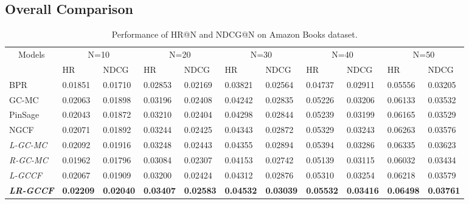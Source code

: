 \documentclass[letterpaper]{article} %
\begin{document}
\subsection{Overall Comparison}  

 

\begin{small} 
\begin{table}[h]
\footnotesize
\centering
\caption{Performance of HR@N and NDCG@N on Amazon Books dataset. }\label{tab:resAmazon} 
\begin{tabular}{|l|l|l|l|l|l|l|l|l|l|l|}
\hline
\multicolumn{1}{|c|}{\multirow{2}{*}{Models}} & \multicolumn{2}{c|}{N=10} & \multicolumn{2}{c|}{N=20} & \multicolumn{2}{c|}{N=30} & \multicolumn{2}{c|}{N=40} & \multicolumn{2}{c|}{N=50} \\ \cline{2-11} 
\multicolumn{1}{|c|}{} & HR & NDCG & HR & NDCG & HR & NDCG & HR & NDCG & HR & NDCG \\ \hline
BPR & 0.01851 & 0.01710 & 0.02853 & 0.02169 & 0.03821 & 0.02564 & 0.04737 & 0.02911 & 0.05556 & 0.03205 \\ \hline 
GC-MC & 0.02063 & 0.01898 & 0.03196 & 0.02408 & 0.04242 & 0.02835 & 0.05226 & 0.03206 & 0.06133 & 0.03532 \\ \hline
PinSage & 0.02043 & 0.01872 & 0.03210 & 0.02404 & 0.04298 & 0.02844 & 0.05239 & 0.03199 & 0.06165 & 0.03529 \\ \hline
NGCF & 0.02071 & 0.01892 & 0.03244 & 0.02425 & 0.04343 & 0.02872 & 0.05329 & 0.03243 & 0.06263 & 0.03576 \\ \hline
\emph{L-GC-MC} & 0.02092 & 0.01916 & 0.03248 & 0.02443 & 0.04355 & 0.02894 & 0.05394 & 0.03286 & 0.06335 & 0.03623 \\ \hline
\emph{R-GC-MC} & 0.01962 & 0.01796 & 0.03084 & 0.02307 & 0.04153 & 0.02742 & 0.05139 & 0.03115 & 0.06032 & 0.03434 \\ \hline 
\emph{L-GCCF} &0.02067 &0.01909 &0.03200 &0.02424 &0.04312 &0.02876 &0.05310 &0.03254 &0.06218 &0.03579  \\ \hline
\emph{\textbf{LR-GCCF}} & \textbf{0.02209} & \textbf{0.02040} & \textbf{0.03407} & \textbf{0.02583} & \textbf{0.04532} & \textbf{0.03039} & \textbf{0.05532} & \textbf{0.03416} & \textbf{0.06498} & \textbf{0.03761} \\ \hline
\end{tabular} 
\end{table} 
\end{small}

 
\end{document}
